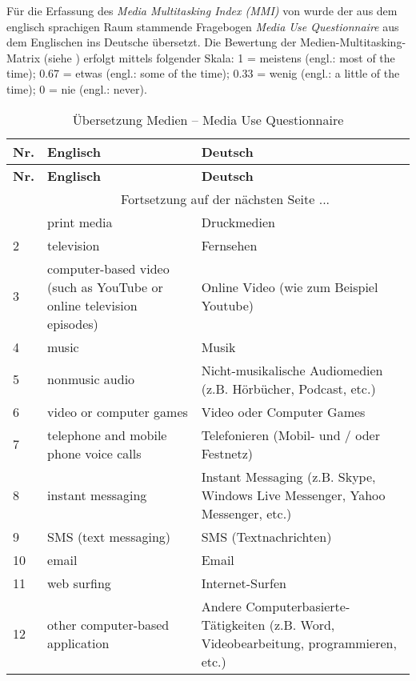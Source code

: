 \begin{RaggedRight}
Für die Erfassung des \textit{Media Multitasking Index (MMI)} von  wurde der aus dem englisch sprachigen Raum stammende Fragebogen \textit{Media Use Questionnaire} aus dem Englischen ins Deutsche übersetzt.
Die Bewertung der Medien-Multitasking-Matrix (siehe ) erfolgt mittels folgender Skala: 1 = meistens (engl.: most of the time); 0.67 = etwas (engl.: some of the time); 0.33 = wenig (engl.: a little of the time); 0 = nie (engl.: never).  \\

\begin{center}
    \begin{longtable}[t]{|l|p{6.6 cm}|p{6.6 cm}|}
    \caption{Übersetzung Medien -- Media Use Questionnaire} \\ \hline
        \textbf{Nr.} & \textbf{Englisch} & \textbf{Deutsch} \\ \hline
        \endfirsthead
        \hline
        \textbf{Nr.} & \textbf{Englisch} & \textbf{Deutsch} \\ \hline
        \endhead 
        & \multicolumn{2}{|c|}{Fortsetzung auf der nächsten Seite $...$ } \\ \hline
        \endfoot
        \hline
        \endlastfoot
        1 & print media & Druckmedien \\
        2 & television & Fernsehen \\
        3 & computer-based video (such as YouTube or online television episodes) & Online Video (wie zum Beispiel Youtube) \\
        4 & music & Musik \\
        5 & nonmusic audio & Nicht-musikalische Audiomedien (z.B. Hörbücher, Podcast, etc.) \\
        6 & video or computer games & Video oder Computer Games \\
        7 & telephone and mobile phone voice calls & Telefonieren (Mobil- und / oder Festnetz) \\
        8 & instant messaging & Instant Messaging (z.B. Skype, Windows Live Messenger, Yahoo Messenger, etc.) \\
        9 & SMS (text messaging) & SMS (Textnachrichten) \\
        10 & email & Email \\
        11 & web surfing & Internet-Surfen \\
        12 & other computer-based application  & Andere Computerbasierte-Tätigkeiten (z.B. Word, Videobearbeitung, programmieren, etc.) \\
        \end{longtable}
	\label{tab.muqUebersetzung}
\end{center}



\end{RaggedRight}
